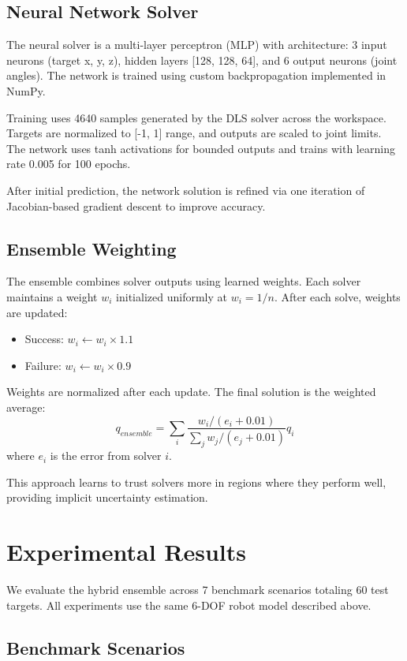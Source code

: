 {{\subsection{Neural Network Solver}
The neural solver is a multi-layer perceptron (MLP) with architecture: 3 input neurons (target x, y, z), hidden layers [128, 128, 64], and 6 output neurons (joint angles). The network is trained using custom backpropagation implemented in NumPy.

Training uses 4640 samples generated by the DLS solver across the workspace. Targets are normalized to [-1, 1] range, and outputs are scaled to joint limits. The network uses tanh activations for bounded outputs and trains with learning rate 0.005 for 100 epochs.

After initial prediction, the network solution is refined via one iteration of Jacobian-based gradient descent to improve accuracy.

\subsection{Ensemble Weighting}
The ensemble combines solver outputs using learned weights. Each solver maintains a weight $w_i$ initialized uniformly at $w_i = 1/n$. After each solve, weights are updated:
\begin{itemize}
    \item Success: $w_i \leftarrow w_i \times 1.1$
    \item Failure: $w_i \leftarrow w_i \times 0.9$
\end{itemize}
Weights are normalized after each update. The final solution is the weighted average:
\begin{equation}
q_{ensemble} = \sum_{i} \frac{w_i / (e_i + 0.01)}{\sum_j w_j / (e_j + 0.01)} q_i
\end{equation}
where $e_i$ is the error from solver $i$.

This approach learns to trust solvers more in regions where they perform well, providing implicit uncertainty estimation.

\section{Experimental Results}

We evaluate the hybrid ensemble across 7 benchmark scenarios totaling 60 test targets. All experiments use the same 6-DOF robot model described above.

\subsection{Benchmark Scenarios}

}}
